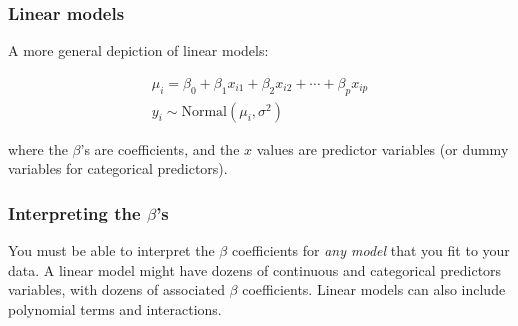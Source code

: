 \documentclass[color=usenames,dvipsnames]{beamer}\usepackage[]{graphicx}\usepackage[]{xcolor}
\begin{document}
\begin{frame}
  \frametitle{Linear models}
    A more general depiction of linear models:


\begin{gather*}
  \mu_i = \beta_0 + \beta_1 x_{i1} + \beta_2 x_{i2} + \cdots + \beta_p x_{ip} \\
  y_i \sim \mathrm{Normal}(\mu_i, \sigma^2)
\end{gather*}

where the $\beta$'s are coefficients, and the $x$ values are predictor
variables (or dummy variables for categorical predictors). %







\end{frame}




\begin{frame}
  \frametitle{Interpreting the $\beta$'s}
You must be able to interpret the $\beta$
coefficients for {\it any model} that you fit to your data.
\pause
\vfill
A linear model might have dozens of continuous and categorical
predictors variables, with dozens of associated $\beta$ coefficients.
\pause
\vfill
Linear models can also include polynomial terms and interactions. 
\end{frame}
\end{document}
